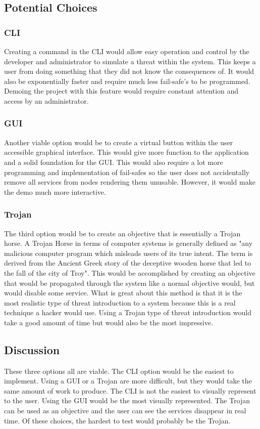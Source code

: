 \documentclass[onecolumn, draftclsnofoot,10pt, compsoc]{IEEEtran}
\begin{document}
\subsection{Potential Choices}
\subsubsection{CLI}
Creating a command in the CLI would allow easy operation and control by the developer and administrator to simulate a threat within the system. This keeps a user from doing something that they did not know the consequences of. It would also be exponentially faster and require much less fail-safe’s to be programmed. Demoing the project with this feature would require constant attention and access by an administrator.
\subsubsection{GUI}
Another viable option would be to create a virtual button within the user accessible graphical interface. This would give more function to the application and a solid foundation for the GUI. This would also require a lot more programming and implementation of fail-safes so the user does not accidentally remove all services from nodes rendering them unusable. However, it would make the demo much more interactive.
\subsubsection{Trojan}
The third option would be to create an objective that is essentially a Trojan horse. A Trojan Horse in terms of computer systems is generally defined as "any malicious computer program which misleads users of its true intent. The term is derived from the Ancient Greek story of the deceptive wooden horse that led to the fall of the city of Troy"\cite{Trojan}. This would be accomplished by creating an objective that would be propagated through the system like a normal objective would, but would disable some service. What is great about this method is that it is the most realistic type of threat introduction to a system because this is a real technique a hacker would use. Using a Trojan type of threat introduction would take a good amount of time but would also be the most impressive.
\subsection{Discussion}
These three options all are viable. The CLI option would be the easiest to implement. Using a GUI or a Trojan are more difficult, but they would take the same amount of work to produce. The CLI is not the easiest to visually represent to the user. Using the GUI would be the most visually represented. The Trojan can be used as an objective and the user can see the services disappear in real time. Of these choices, the hardest to test would probably be the Trojan.
\end{document}

